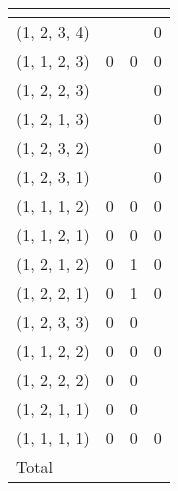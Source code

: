 \documentclass{article}
\begin{document}
\begin{table}[h]
\centering
\begin{tabular}{llll}
\multicolumn{1}{l|}{}        &  &  &  \\ \hline
\multicolumn{1}{l|}{(1, 2, 3, 4)} &       &         & 0             \\
\multicolumn{1}{l|}{(1, 1, 2, 3)} & 0             & 0             & 0             \\
\multicolumn{1}{l|}{(1, 2, 2, 3)} &            &             & 0             \\
\multicolumn{1}{l|}{(1, 2, 1, 3)} &            &              & 0             \\
\multicolumn{1}{l|}{(1, 2, 3, 2)} &            &              & 0             \\
\multicolumn{1}{l|}{(1, 2, 3, 1)} &            &              & 0             \\
\multicolumn{1}{l|}{(1, 1, 1, 2)} & 0             & 0             & 0             \\
\multicolumn{1}{l|}{(1, 1, 2, 1)} & 0             & 0             & 0             \\
\multicolumn{1}{l|}{(1, 2, 1, 2)} & 0             & 1             & 0             \\
\multicolumn{1}{l|}{(1, 2, 2, 1)} & 0             & 1             & 0             \\
\multicolumn{1}{l|}{(1, 2, 3, 3)} & 0             & 0             &         \\
\multicolumn{1}{l|}{(1, 1, 2, 2)} & 0             & 0             & 0             \\
\multicolumn{1}{l|}{(1, 2, 2, 2)} & 0             & 0             &              \\
\multicolumn{1}{l|}{(1, 2, 1, 1)} & 0             & 0             &              \\
\multicolumn{1}{l|}{(1, 1, 1, 1)} & 0             & 0             & 0             \\ \hline
\multicolumn{1}{l|}{Total}                             &             &             &            
\end{tabular}
\caption{}
\label{table:mN}
\end{table}
\end{document}
